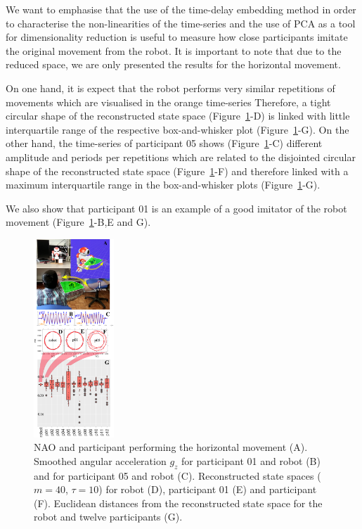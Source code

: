 \documentclass{sig-alternate-05-2015}
\begin{document}
We want to emphasise that the use of the time-delay embedding 
method in order to characterise the non-linearities of the time-series 
and the use of PCA as a tool for dimensionality 
reduction is useful to measure how close participants 
imitate the original movement from the robot.
It is important to note that due to the reduced space, we are only presented
the results for the horizontal movement.

On one hand, it is expect that the robot performs very similar repetitions of movements 
which are visualised in the orange time-series
Therefore, a tight circular  shape of the reconstructed state space (Figure~\ref{fig:main}-D)
is linked with little interquartile range of the respective box-and-whisker plot  (Figure~\ref{fig:main}-G).
On the other hand, 
the time-series of participant 05 shows (Figure~\ref{fig:main}-C)
 different amplitude and periods per repetitions which
are related to the disjointed circular shape of 
the reconstructed state space (Figure~\ref{fig:main}-F) and therefore 
linked with a maximum interquartile range in the  box-and-whisker plots  (Figure~\ref{fig:main}-G).

We also show that participant 01 is an example of a good imitator of the robot movement
(Figure~\ref{fig:main}-B,E and G).




\begin{figure}[ht]
\centering
\includegraphics[width=0.27\textwidth]{fig06}
\caption{
NAO and participant performing the horizontal movement (A). 
Smoothed angular acceleration $g_z$ for participant 01  and robot (B)
and for participant 05 and robot (C).
Reconstructed state spaces  ($m=40$, $\tau=10$) for robot (D), participant 01 (E) and participant (F).
Euclidean distances from the reconstructed state space for the robot and twelve participants (G).
}
\label{fig:main}
\end{figure}
\end{document}
